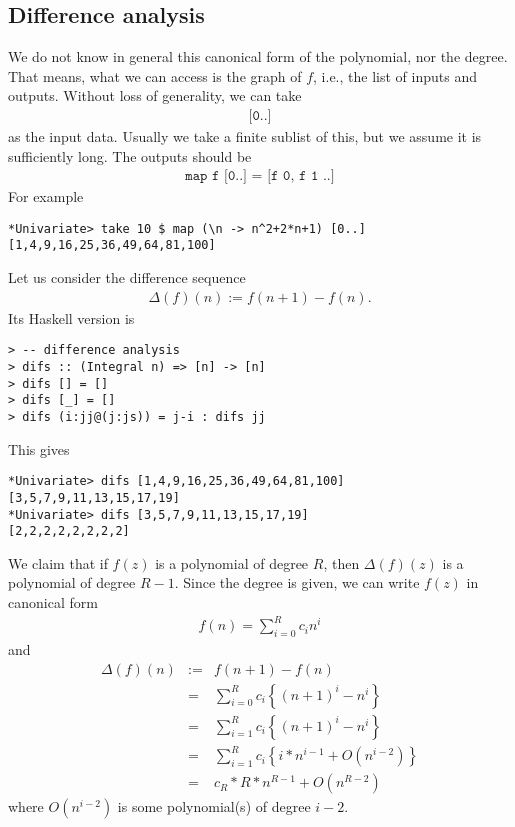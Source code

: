 \documentclass[11pt]{book}
\begin{document}
\subsection{Difference analysis}
We do not know in general this canonical form of the polynomial, nor the degree.
That means, what we can access is the graph of $f$, i.e., the list of inputs and outputs.
Without loss of generality, we can take
\begin{eqnarray}
\texttt{[0..]}
\end{eqnarray}
as the input data.
Usually we take a finite sublist of this, but we assume it is sufficiently long.
The outputs should be
\begin{eqnarray}
\texttt{map f [0..] = [f 0, f 1 ..]}
\end{eqnarray}
For example
\begin{verbatim}
*Univariate> take 10 $ map (\n -> n^2+2*n+1) [0..]
[1,4,9,16,25,36,49,64,81,100]
\end{verbatim}

Let us consider the difference sequence
\begin{eqnarray}
\label{difference}
\Delta(f) (n) := f(n+1) - f(n).
\end{eqnarray}
Its Haskell version is
\begin{verbatim}
> -- difference analysis
> difs :: (Integral n) => [n] -> [n]
> difs [] = []
> difs [_] = []
> difs (i:jj@(j:js)) = j-i : difs jj
\end{verbatim}
This gives
\begin{verbatim}
*Univariate> difs [1,4,9,16,25,36,49,64,81,100]
[3,5,7,9,11,13,15,17,19]
*Univariate> difs [3,5,7,9,11,13,15,17,19]
[2,2,2,2,2,2,2,2]
\end{verbatim}

We claim that if $f(z)$ is a polynomial of degree $R$, then $\Delta(f)(z)$ is a polynomial of degree $R-1$.
Since the degree is given, we can write $f(z)$ in canonical form
\begin{eqnarray}
f(n) = \sum_{i=0}^R c_i n^i
\end{eqnarray}
and
\begin{eqnarray}
\Delta(f)(n) &:=& f(n+1) - f(n) \\
&=& \sum_{i=0}^R c_i \left\{ (n+1)^i - n^i\right\} \\
&=& \sum_{i=1}^R c_i \left\{ (n+1)^i - n^i\right\} \\
&=& \sum_{i=1}^R c_i \left\{ i*n^{i-1} + O(n^{i-2}) \right\} \\
&=& c_R*R*n^{R-1} + O(n^{R-2})
\end{eqnarray}
where $O(n^{i-2})$ is some polynomial(s) of degree $i-2$.
\end{document}
